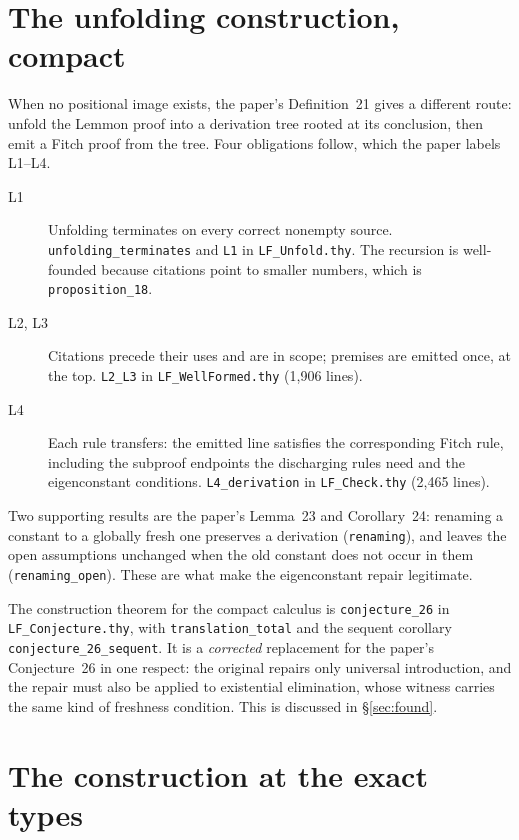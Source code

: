 \documentclass[11pt]{article}
\theoremstyle{plain}
\newcommand{\ubrk}{\_\discretionary{}{}{}}
\newcommand{\isa}[1]{\textup{\texttt{\small #1}}}
\newcommand{\thy}[1]{\textup{\texttt{\small #1}}}
\begin{document}
\section{The unfolding construction, compact}\label{sec:construction}

When no positional image exists, the paper's Definition~21 gives a different
route: unfold the Lemmon proof into a derivation tree rooted at its conclusion,
then emit a Fitch proof from the tree. Four obligations follow, which the paper
labels L1--L4.

\begin{description}
\item[L1] Unfolding terminates on every correct nonempty source.
  \isa{unfolding\ubrk{}terminates} and \isa{L1} in \thy{LF\ubrk{}Unfold.thy}. The
  recursion is well-founded because citations point to smaller numbers, which
  is \isa{proposition\ubrk{}18}.
\item[L2, L3] Citations precede their uses and are in scope; premises are
  emitted once, at the top. \isa{L2\ubrk{}L3} in \thy{LF\ubrk{}WellFormed.thy}
  (1{,}906 lines).
\item[L4] Each rule transfers: the emitted line satisfies the corresponding
  Fitch rule, including the subproof endpoints the discharging rules need and
  the eigenconstant conditions. \isa{L4\ubrk{}derivation} in \thy{LF\ubrk{}Check.thy}
  (2{,}465 lines).
\end{description}

\noindent
Two supporting results are the paper's Lemma~23 and Corollary~24: renaming a
constant to a globally fresh one preserves a derivation (\isa{renaming}), and
leaves the open assumptions unchanged when the old constant does not occur in
them (\isa{renaming\ubrk{}open}). These are what make the eigenconstant repair
legitimate.

The construction theorem for the compact calculus is \isa{conjecture\ubrk{}26} in
\thy{LF\ubrk{}Conjecture.thy}, with \isa{translation\ubrk{}total} and the sequent
corollary \isa{conjecture\ubrk{}26\ubrk{}sequent}. It is a \emph{corrected} replacement
for the paper's Conjecture~26 in one respect: the original repairs only
universal introduction, and the repair must also be applied to existential
elimination, whose witness carries the same kind of freshness condition. This is
discussed in \S\ref{sec:found}.

\section{The construction at the exact types}\label{sec:exact}
\end{document}
